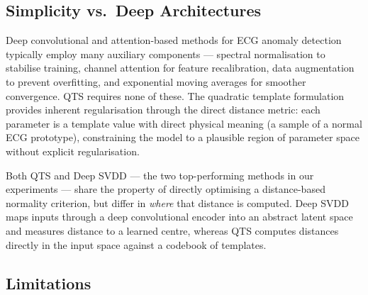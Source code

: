 \documentclass{iopjournal}
\begin{document}
\subsection{Simplicity vs.\ Deep Architectures}

Deep convolutional and attention-based methods for ECG anomaly detection typically employ many auxiliary components --- spectral normalisation to stabilise training, channel attention for feature recalibration, data augmentation to prevent overfitting, and exponential moving averages for smoother convergence. QTS requires none of these. The quadratic template formulation provides inherent regularisation through the direct distance metric: each parameter is a template value with direct physical meaning (a sample of a normal ECG prototype), constraining the model to a plausible region of parameter space without explicit regularisation.

Both QTS and Deep SVDD --- the two top-performing methods in our experiments --- share the property of directly optimising a distance-based normality criterion, but differ in \emph{where} that distance is computed. Deep SVDD maps inputs through a deep convolutional encoder into an abstract latent space and measures distance to a learned centre, whereas QTS computes distances directly in the input space against a codebook of templates. 

\subsection{Limitations}\label{sec:limitations}
\end{document}
